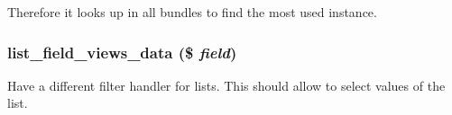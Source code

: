 Therefore it looks up in all bundles to find the most used instance. \hypertarget{field_8views_8inc_afb67c64115540e28d7e1b8ddaa3a5569}{
\subsubsection[{list\_\-field\_\-views\_\-data}]{\setlength{\rightskip}{0pt plus 5cm}list\_\-field\_\-views\_\-data (\$ {\em field})}}
\label{field_8views_8inc_afb67c64115540e28d7e1b8ddaa3a5569}
Have a different filter handler for lists. This should allow to select values of the list. 
